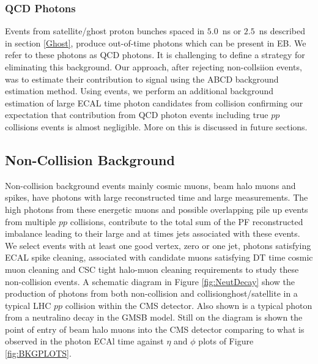 \subsubsection{QCD Photons}
Events from satellite/ghost proton bunches spaced in $5.0$~ns or $2.5$~ns described in section \ref{Ghost}, produce out-of-time photons which can be present in EB. We refer to these photons as QCD photons. It is challenging to define a strategy for eliminating this background. Our approach, after rejecting non-collsiion events, was to estimate their contribution to signal using the \textsf{ABCD} background estimation method. Using \PZ events, we perform an additional background estimation of large ECAL time photon candidates from collision confirming our expectation that contribution from QCD photon events including true $pp$ collisions events is almost negligible. More on this is discussed in future sections.
\subsection{Non-Collision Background}
Non-collision background events mainly cosmic muons, beam halo muons and spikes, have photons with large reconstructed time and large \ETslash\hspace{0.15cm} measurements. The high \pt photons from these energetic muons and possible overlapping  pile up events from multiple $pp$ collisions, contribute to the total sum of the PF reconstructed \pt imbalance leading to their large \ETslash\hspace{0.15cm} and at times jets associated with these events.
We select events with at least one good vertex, zero or one jet, photons satisfying ECAL spike cleaning, associated with candidate muons satisfying DT time cosmic muon cleaning and CSC tight halo-muon cleaning requirements to study these non-collision events. 
A schematic diagram in Figure \ref{fig:NeutDecay} show the production of photons from both non-collision and collision{ghost/satellite} in a typical LHC $pp$ collision within the CMS detector. Also shown is a typical photon from a neutralino decay in the GMSB model. Still on the diagram is shown the point of entry of beam halo muons into the CMS detector comparing to what is observed in the photon ECAl time against $\eta$ and $\phi$ plots of Figure \ref{fig:BKGPLOTS}.
